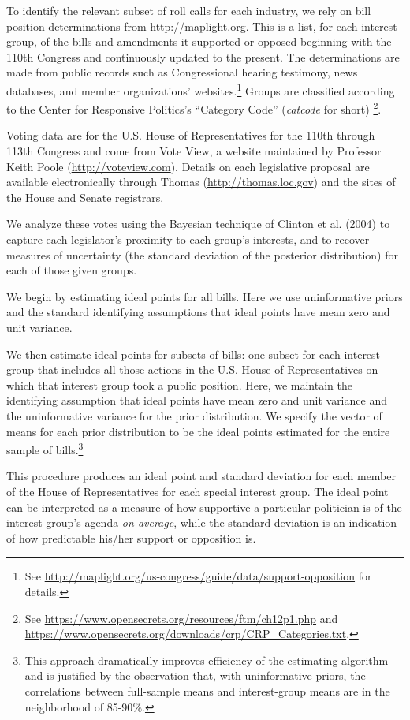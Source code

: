 \documentclass[12pt]{article}
\begin{document}
To identify the relevant subset of roll calls for each industry, we rely on bill position determinations from \url{http://maplight.org}. This is a list, for each interest group, of the bills and amendments it supported or opposed beginning with the 110th Congress and continuously updated to the present. The determinations are made from public records such as Congressional hearing testimony, news databases, and member organizations' websites.\footnote{See \url{http://maplight.org/us-congress/guide/data/support-opposition} for details.} Groups are classified according to the Center for Responsive Politics's ``Category Code'' (\textit{catcode} for short) \footnote{See \url{https://www.opensecrets.org/resources/ftm/ch12p1.php} and \url{https://www.opensecrets.org/downloads/crp/CRP_Categories.txt}.}.

Voting data are for the U.S. House of Representatives for the 110th through 113th Congress and come from Vote View, a website maintained by Professor Keith Poole (\url{http://voteview.com}). Details on each legislative proposal are available electronically through Thomas (\url{http://thomas.loc.gov}) and the sites of the House and Senate registrars.

We analyze these votes using the Bayesian technique of Clinton et al. (2004) to capture each legislator's proximity to each group's interests, and to recover measures of uncertainty (the standard deviation of the posterior distribution) for each of those given groups.

We begin by estimating ideal points for all bills. Here we use uninformative priors and the standard identifying assumptions that ideal points have mean zero and unit variance.

We then estimate ideal points for subsets of bills: one subset for each interest group that includes all those actions in the U.S. House of Representatives on which that interest group took a public position. Here, we maintain the identifying assumption that ideal points have mean zero and unit variance and the uninformative variance for the prior distribution. We specify the vector of means for each prior distribution to be the ideal points estimated for the entire sample of bills.\footnote{This approach dramatically improves efficiency of the estimating algorithm and is justified by the observation that, with uninformative priors, the correlations between full-sample means and interest-group means are in the neighborhood of 85-90$\%$.}

This procedure produces an ideal point and standard deviation for each member of the House of Representatives for each special interest group. The ideal point can be interpreted as a measure of how supportive a particular politician is of the interest group's agenda \textit{on average}, while the standard deviation is an indication of how predictable his/her support or opposition is.
\end{document}
